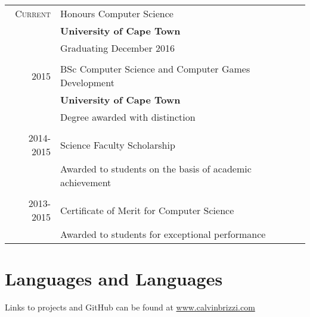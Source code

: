 \documentclass[a4paper,10pt]{article} %
\begin{document}
\begin{tabular}{rl}
\textsc{Current} & Honours Computer Science\\
& \textbf{University of Cape Town}\\
& Graduating December 2016\\
&\\

\textsc{2015} & BSc Computer Science and Computer Games Development\\
& \textbf{University of Cape Town}\\
& Degree awarded with distinction\\
&\\





\textsc{2014-2015} & Science Faculty Scholarship\\
& Awarded to students on the basis of academic achievement\\
&\\
\textsc{2013-2015} & Certificate of Merit for Computer Science\\
& Awarded to students for exceptional performance\\


\end{tabular}


\section{Languages and Languages}
Links to projects and GitHub can be found at \href{www.calvinbrizzi.com}{www.calvinbrizzi.com}
\end{document}
